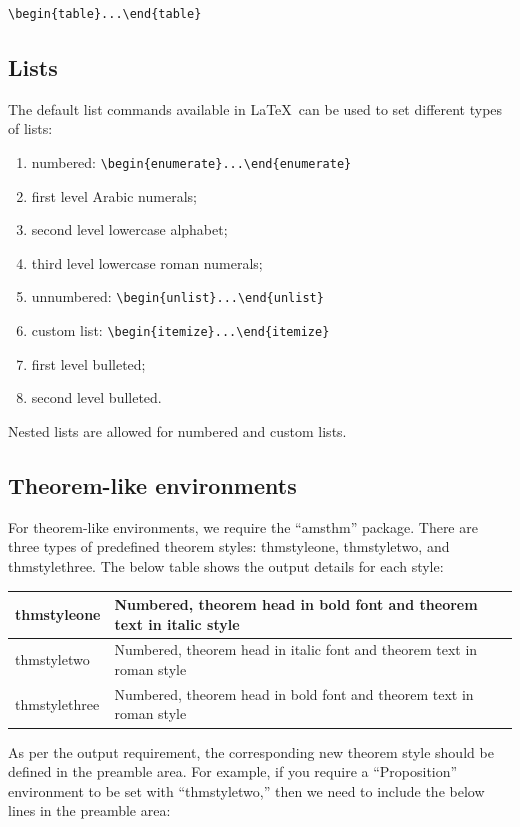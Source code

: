 \documentclass{article}
\begin{document}
\begin{verbatim}
\begin{table}...\end{table}
\end{verbatim}

\subsection{Lists}
The default list commands available in \LaTeX\ can be used to set different types of lists:

\begin{enumerate}
\item numbered: \verb+\begin{enumerate}...\end{enumerate}+
\item[] first level Arabic numerals;
\item[]second level lowercase alphabet;
\item[]third level lowercase roman numerals;
\item unnumbered: \verb+\begin{unlist}...\end{unlist}+
\item custom list: \verb+\begin{itemize}...\end{itemize}+
\item[]first level bulleted;
\item[]second level bulleted.
\end{enumerate}
Nested lists are allowed for numbered and custom lists.

\subsection{Theorem-like environments}

For theorem-like environments, we require the ``amsthm'' package.
There are three types of predefined theorem styles: thmstyleone,
thmstyletwo, and thmstylethree. The below table shows the output
details for each style:
\begin{center}\begin{tabular}{|l|p{22pc}|}
\hline thmstyleone &Numbered, theorem head in bold font and theorem text in italic style\\
\hline
thmstyletwo & Numbered, theorem head in italic font and theorem text in roman style\\
\hline
thmstylethree & Numbered, theorem head in bold font and theorem text in roman style\\
\hline
\end{tabular}\end{center}
As per the output requirement, the corresponding new theorem style should be defined in the preamble area. For example, if you require a ``Proposition'' environment to be set with ``thmstyletwo,'' then we need to include the below lines in the preamble area:
\end{document}
